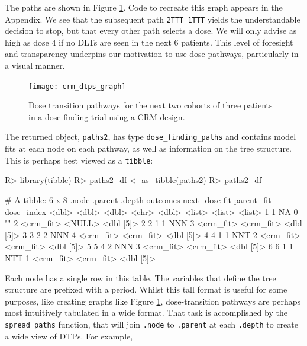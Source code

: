 \documentclass[article]{jss}
\begin{document}
The paths are shown in Figure \ref{fig:crm_dtps_graph}. Code to recreate
this graph appears in the Appendix. We see that the subsequent path
\texttt{2TTT\ 1TTT} yields the understandable decision to stop, but that
every other path selects a dose. We will only advise as high as dose 4
if no DLTs are seen in the next 6 patients. This level of foresight and
transparency underpins our motivation to use dose pathways, particularly
in a visual manner.

\begin{figure}
  \centering
  \texttt{[image: crm\_dtps\_graph]}
  \caption{Dose transition pathways for the next two cohorts of three patients in a dose-finding trial using a CRM design.}
  \label{fig:crm_dtps_graph}
\end{figure}

The returned object, \texttt{paths2}, has type
\texttt{dose\_finding\_paths} and contains model fits at each node on
each pathway, as well as information on the tree structure. This is
perhaps best viewed as a \texttt{tibble}:

\begin{CodeChunk}

\begin{CodeInput}
R> library(tibble)
R> paths2_df <- as_tibble(paths2) 
R> paths2_df %
\end{CodeInput}

\begin{CodeOutput}
# A tibble: 6 x 8
  .node .parent .depth outcomes next_dose fit       parent_fit dose_index
  <dbl>   <dbl>  <dbl> <chr>        <dbl> <list>    <list>     <list>    
1     1      NA      0 ""               2 <crm_fit> <NULL>     <dbl [5]> 
2     2       1      1 NNN              3 <crm_fit> <crm_fit>  <dbl [5]> 
3     3       2      2 NNN              4 <crm_fit> <crm_fit>  <dbl [5]> 
4     4       1      1 NNT              2 <crm_fit> <crm_fit>  <dbl [5]> 
5     5       4      2 NNN              3 <crm_fit> <crm_fit>  <dbl [5]> 
6     6       1      1 NTT              1 <crm_fit> <crm_fit>  <dbl [5]> 
\end{CodeOutput}
\end{CodeChunk}

Each node has a single row in this table. The variables that define the
tree structure are prefixed with a period. Whilst this tall format is
useful for some purposes, like creating graphs like Figure
\ref{fig:crm_dtps_graph}, dose-transition pathways are perhaps most
intuitively tabulated in a wide format. That task is accomplished by the
\texttt{spread\_paths} function, that will join \texttt{.node} to
\texttt{.parent} at each \texttt{.depth} to create a wide view of DTPs.
For example,
\end{document}
